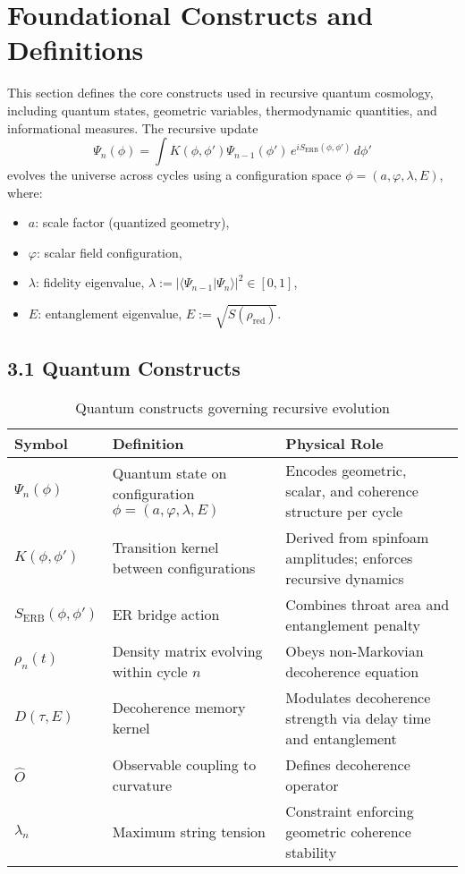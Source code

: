 \section{Foundational Constructs and Definitions}
\label{sec:foundations}

This section defines the core constructs used in recursive quantum cosmology, including quantum states, geometric variables, thermodynamic quantities, and informational measures. The recursive update
\[
\Psi_n(\phi) = \int K(\phi, \phi') \Psi_{n-1}(\phi') \, e^{i S_{\text{ERB}}(\phi, \phi')} \, d\phi'
\]
evolves the universe across cycles using a configuration space \( \phi = (a, \varphi, \lambda, E) \), where:
\begin{itemize}
    \item \( a \): scale factor (quantized geometry),
    \item \( \varphi \): scalar field configuration,
    \item \( \lambda \): fidelity eigenvalue, \( \lambda := |\langle \Psi_{n-1} | \Psi_n \rangle|^2 \in [0,1] \),
    \item \( E \): entanglement eigenvalue, \( E := \sqrt{S(\rho_{\text{red}})} \).
\end{itemize}

\subsection{3.1 Quantum Constructs}
\label{subsec:quantum-constructs}

\begin{table}[H]
\centering
\begin{tabular}{>{\raggedright}p{3cm}>{\raggedright}p{7cm}>{\raggedright\arraybackslash}p{5cm}}
\toprule
\textbf{Symbol} & \textbf{Definition} & \textbf{Physical Role} \\
\midrule
\( \Psi_n(\phi) \) & Quantum state on configuration \( \phi = (a, \varphi, \lambda, E) \) & Encodes geometric, scalar, and coherence structure per cycle \\
\addlinespace
\( K(\phi, \phi') \) & Transition kernel between configurations & Derived from spinfoam amplitudes; enforces recursive dynamics \\
\addlinespace
\( S_{\text{ERB}}(\phi, \phi') \) & ER bridge action & Combines throat area and entanglement penalty \\
\addlinespace
\( \rho_n(t) \) & Density matrix evolving within cycle \( n \) & Obeys non-Markovian decoherence equation \\
\addlinespace
\( D(\tau, E) \) & Decoherence memory kernel & Modulates decoherence strength via delay time and entanglement \\
\addlinespace
\( \hat{O} \) & Observable coupling to curvature & Defines decoherence operator \\
\addlinespace
\( \lambda_n \) & Maximum string tension & Constraint enforcing geometric coherence stability \\
\bottomrule
\end{tabular}
\caption{Quantum constructs governing recursive evolution}
\end{table}

